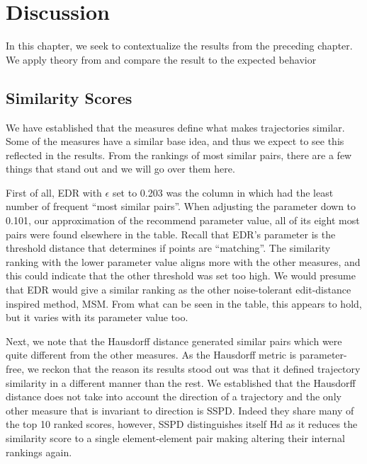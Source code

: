 \chapter{Discussion}
\label{ch:7}
In this chapter, we seek to contextualize the results from the preceding chapter. 
We apply theory from  and compare the result to the expected behavior 

\section{Similarity Scores}

We have established that the measures define what makes trajectories similar. 
Some of the measures have a similar base idea, and thus we expect to see this reflected in the results. 
From the rankings of most similar pairs, there are a few things that stand out and we will go over them here.



First of all, EDR with $\epsilon$ set to 0.203 was the column in  which had the least number of frequent “most similar pairs”. 
When adjusting the parameter down to 0.101, our approximation of the recommend parameter value, all of its eight most pairs were found elsewhere in the table.
Recall that EDR’s parameter is the threshold distance that determines if points are “matching”. 
The similarity ranking with the lower parameter value aligns more with the other measures, and this could indicate that the other threshold was set too high.
We would presume that EDR would give a similar ranking as the other noise-tolerant edit-distance inspired method, MSM.
From what can be seen in the table, this appears to hold, but it varies with its parameter value too. 


Next, we note that the Hausdorff distance generated similar pairs which were quite different from the other measures. 
As the Hausdorff metric is parameter-free, we reckon that the reason its results stood out was that it defined trajectory similarity in a different manner than the rest. 
We established that the Hausdorff distance does not take into account the direction of a trajectory and the only other measure that is invariant to direction is SSPD. 
Indeed they share many of the top 10 ranked scores, however, SSPD distinguishes itself Hd as it reduces the similarity score to a single element-element pair making altering their internal rankings again. 

